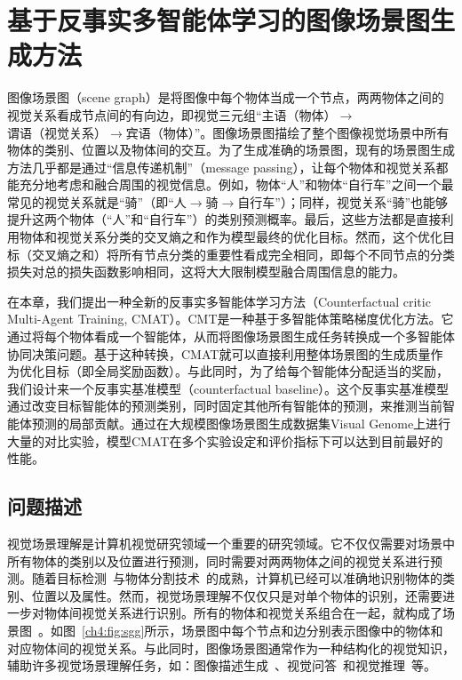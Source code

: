 \chapter{基于反事实多智能体学习的图像场景图生成方法}

图像场景图（scene graph）是将图像中每个物体当成一个节点，两两物体之间的视觉关系看成节点间的有向边，即视觉三元组“主语（物体）$\to$谓语（视觉关系）$\to$宾语（物体）”。图像场景图描绘了整个图像视觉场景中所有物体的类别、位置以及物体间的交互。为了生成准确的场景图，现有的场景图生成方法几乎都是通过“信息传递机制”（message passing），让每个物体和视觉关系都能充分地考虑和融合周围的视觉信息。例如，物体“人”和物体“自行车”之间一个最常见的视觉关系就是“骑”（即“人$\to$骑$\to$自行车”）；同样，视觉关系“骑”也能够提升这两个物体（“人”和“自行车”）的类别预测概率。最后，这些方法都是直接利用物体和视觉关系分类的交叉熵之和作为模型最终的优化目标。然而，这个优化目标（交叉熵之和）将所有节点分类的重要性看成完全相同，即每个不同节点的分类损失对总的损失函数影响相同，这将大大限制模型融合周围信息的能力。

在本章，我们提出一种全新的反事实多智能体学习方法（Counterfactual critic Multi-Agent Training, CMAT）。CMT是一种基于多智能体策略梯度优化方法。它通过将每个物体看成一个智能体，从而将图像场景图生成任务转换成一个多智能体协同决策问题。基于这种转换，CMAT就可以直接利用整体场景图的生成质量作为优化目标（即全局奖励函数）。与此同时，为了给每个智能体分配适当的奖励，我们设计来一个反事实基准模型（counterfactual baseline）。这个反事实基准模型通过改变目标智能体的预测类别，同时固定其他所有智能体的预测，来推测当前智能体预测的局部贡献。通过在大规模图像场景图生成数据集Visual Genome上进行大量的对比实验，模型CMAT在多个实验设定和评价指标下可以达到目前最好的性能。


\section{问题描述}

视觉场景理解是计算机视觉研究领域一个重要的研究领域。它不仅仅需要对场景中所有物体的类别以及位置进行预测，同时需要对两两物体之间的视觉关系进行预测。随着目标检测~\cite{ren2015faster,liu2016ssd}与物体分割技术~\cite{long2015fully,he2017mask}的成熟，计算机已经可以准确地识别物体的类别、位置以及属性。然而，视觉场景理解不仅仅只是对单个物体的识别，还需要进一步对物体间视觉关系进行识别。所有的物体和视觉关系组合在一起，就构成了场景图~\cite{johnson2015image}。如图~\ref{ch4:fig:sgg}所示，场景图中每个节点和边分别表示图像中的物体和对应物体间的视觉关系。与此同时，图像场景图通常作为一种结构化的视觉知识，辅助许多视觉场景理解任务，如：图像描述生成~\cite{yao2018exploring,yang2019auto,kim2019dense}、视觉问答~\cite{norcliffe2018learning,hudson2019gqa}和视觉推理~\cite{shi2019explainable,haurilet2019s}等。

